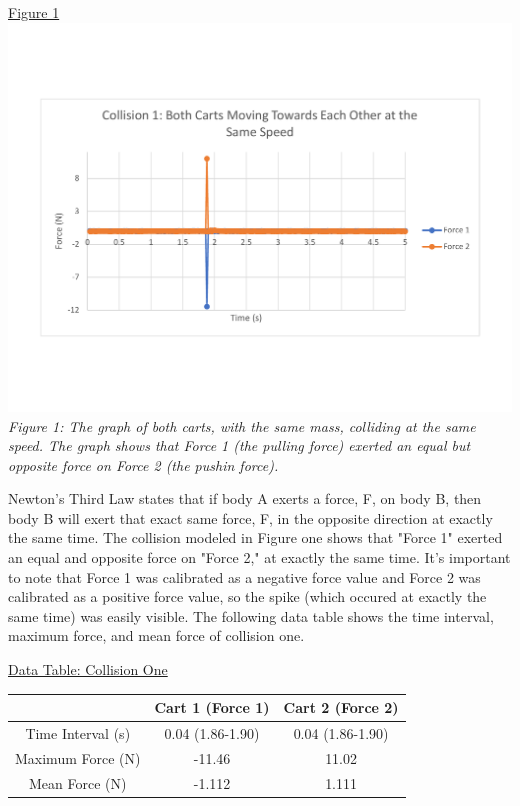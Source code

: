 \documentclass[aps,letterpaper,11pt]{revtex4}
\begin{document}
\newpage

\begin{center}
\underline{Figure 1}\\
\vspace{-10mm}
\includegraphics[width=6in]{FirstCollisionGraph.pdf}\\
\vspace{-10mm}
\textit{Figure 1: The graph of both carts, with the same mass, colliding at the same speed. The graph shows that Force 1 (the pulling force) exerted an equal but opposite force on Force 2 (the pushin force).}
\end{center}

Newton's Third Law states that if body A exerts a force, F, on body B, then body B will exert that exact same force, F, in the opposite direction at exactly the same time. The collision modeled in Figure one shows that "Force 1" exerted an equal and opposite force on "Force 2," at exactly the same time. It's important to note that Force 1 was calibrated as a negative force value and Force 2 was calibrated as a positive force value, so the spike (which occured at exactly the same time) was easily visible. The following data table shows the time interval, maximum force, and mean force of collision one. 

\begin{center}
\underline{Data Table: Collision One}\\
\begin{tabular}{ |c|c|c| }
\hline
 & Cart 1 (Force 1) & Cart 2 (Force 2)\\
\hline
Time Interval (s) & 0.04 (1.86-1.90) & 0.04 (1.86-1.90)\\
\hline
Maximum Force (N) & -11.46 & 11.02\\
\hline
Mean Force (N) & -1.112 & 1.111\\
\hline
\end{tabular}
\end{center}
\end{document}
